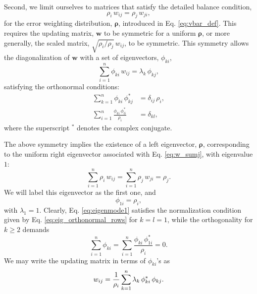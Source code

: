 \documentclass[reprint, superscriptaddress, floatfix]{revtex4-1}
\begin{document}
Second, we limit ourselves to matrices %
that satisfy
the detailed balance condition,
%
\begin{equation}
  \rho_i \, w_{ij} = \rho_j \, w_{ji}
  ,
  \label{eq:w_detailedbalance}
\end{equation}
%
for the error weighting distribution, $\pmb \rho$,
introduced in Eq. \eqref{eq:vbar_def}.
%
This requires the updating matrix, $\mathbf w$
to be symmetric
for a uniform $\pmb\rho$,
or more generally,
the scaled matrix, $\sqrt{ \rho_i/\rho_j } \, w_{ij}$,
to be symmetric.
%
This symmetry allows the diagonalization
of $\mathbf w$ with a set of
eigenvectors, $\phi_{ki}$,
%
\begin{equation}
  \sum_{i = 1}^n \phi_{ki} \, w_{ij}
  =
  \lambda_k \, \phi_{kj}
  ,
\label{eq:eig_w}
\end{equation}
%
satisfying the orthonormal conditions\cite{vankampen}:
%
\begin{align}
  \sum_{k = 1}^n
    \phi_{ki} \, \phi_{kj}^*
  &=
  \delta_{ij} \, \rho_i,
  \label{eq:eig_orthonormal_cols}
  \\
  \sum_{i = 1}^n
    \frac{ \phi_{ki} \, \phi_{li}^* }
         { \rho_i }
  &=
  \delta_{kl}
  ,
  \label{eq:eig_orthonormal_rows}
\end{align}
%
where the superscript $^*$
denotes the complex conjugate.

The above symmetry implies the existence of
a left eigenvector, $\pmb \rho$,
corresponding to the uniform right eigenvector
associated with Eq. \eqref{eq:w_sumj},
with eigenvalue $1$:
%
\begin{equation}
  \sum_{i = 1}^n \rho_i \, w_{ij}
  =
  \sum_{i = 1}^n \rho_j \, w_{ji}
  =
  \rho_j
  .
  \label{eq:w_balance}
\end{equation}
%
We will label this eigenvector as the first one,
and
%
\begin{equation}
  \phi_{1i} = \rho_i,
\label{eq:eigenmode1}
\end{equation}
%
with $\lambda_1 = 1$.
%
Clearly, Eq. \eqref{eq:eigenmode1}
satisfies the normalization condition
given by Eq. \eqref{eq:eig_orthonormal_rows}
for $k = l = 1$,
while the orthogonality for $k \ge 2$ demands
%
\begin{equation}
  \sum_{ i = 1 }^n \phi_{ki}
  =
  \sum_{ i = 1 }^n
    \frac{ \phi_{ki} \, \phi_{1i}^* }
         { \rho_i }
  =
  0
  .
\label{eq:ortho1}
\end{equation}
%
We may write the updating matrix in terms of $\phi_{ki}$'s as
%
\begin{equation}
  w_{ij}
  =
  \frac{1}{\rho_i} \sum_{k=1}^n
  \lambda_k \, \phi_{ki}^* \, \phi_{kj}
  .
  \notag
\end{equation}
\end{document}
